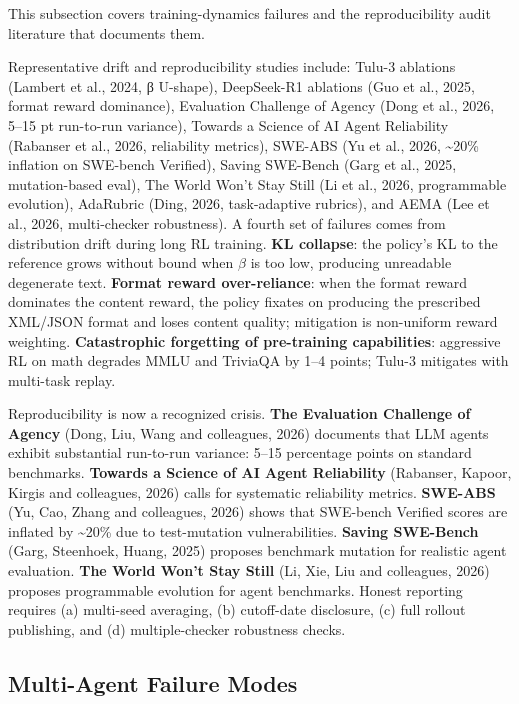 This subsection covers training-dynamics failures and the reproducibility audit literature that documents them.

Representative drift and reproducibility studies include: Tulu-3 ablations (Lambert et al., 2024, β U-shape), DeepSeek-R1 ablations (Guo et al., 2025, format reward dominance), Evaluation Challenge of Agency (Dong et al., 2026, 5--15 pt run-to-run variance), Towards a Science of AI Agent Reliability (Rabanser et al., 2026, reliability metrics), SWE-ABS (Yu et al., 2026, \textasciitilde20\% inflation on SWE-bench Verified), Saving SWE-Bench (Garg et al., 2025, mutation-based eval), The World Won't Stay Still (Li et al., 2026, programmable evolution), AdaRubric (Ding, 2026, task-adaptive rubrics), and AEMA (Lee et al., 2026, multi-checker robustness). A fourth set of failures comes from distribution drift during long RL training. \textbf{KL collapse}: the policy's KL to the reference grows without bound when \(\beta\) is too low, producing unreadable degenerate text. \textbf{Format reward over-reliance}: when the format reward dominates the content reward, the policy fixates on producing the prescribed XML/JSON format and loses content quality; mitigation is non-uniform reward weighting. \textbf{Catastrophic forgetting of pre-training capabilities}: aggressive RL on math degrades MMLU and TriviaQA by 1--4 points; Tulu-3 mitigates with multi-task replay.

Reproducibility is now a recognized crisis. \textbf{The Evaluation Challenge of Agency} (Dong, Liu, Wang and colleagues, 2026) documents that LLM agents exhibit substantial run-to-run variance: 5--15 percentage points on standard benchmarks. \textbf{Towards a Science of AI Agent Reliability} (Rabanser, Kapoor, Kirgis and colleagues, 2026) calls for systematic reliability metrics. \textbf{SWE-ABS} (Yu, Cao, Zhang and colleagues, 2026) shows that SWE-bench Verified scores are inflated by \textasciitilde20\% due to test-mutation vulnerabilities. \textbf{Saving SWE-Bench} (Garg, Steenhoek, Huang, 2025) proposes benchmark mutation for realistic agent evaluation. \textbf{The World Won't Stay Still} (Li, Xie, Liu and colleagues, 2026) proposes programmable evolution for agent benchmarks. Honest reporting requires (a) multi-seed averaging, (b) cutoff-date disclosure, (c) full rollout publishing, and (d) multiple-checker robustness checks.

\subsection{Multi-Agent Failure Modes}\label{multi-agent-failure-modes}

